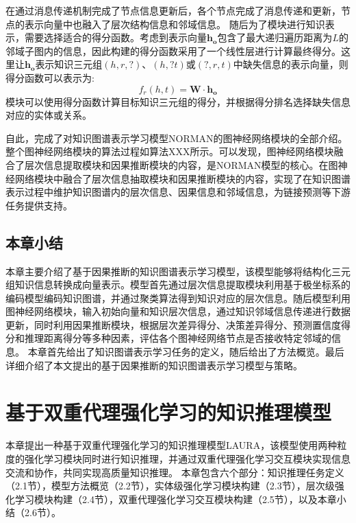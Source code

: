 \documentclass[algorithmlist, AutoFakeBold, AutoFakeSlant, figurelist, tablelist, nomlist, masters]{seuthesix}
\begin{document}
在通过消息传递机制完成了节点信息更新后，各个节点完成了消息传递和更新，节点的表示向量中也融入了层次结构信息和邻域信息。
随后为了模块进行知识表示，需要选择适合的得分函数。考虑到表示向量$\bm{h_o}$包含了最大递归遍历距离为$L$的邻域子图内的信息，因此构建的得分函数采用了一个线性层进行计算最终得分。这里让$\bm{h_o}$表示知识三元组$(h, r, ?)$、$(h, ? t)$或$(?, r, t)$中缺失信息的表示向量，则得分函数可以表示为:
\begin{equation}
  f_{r}(h, t) = \mathbf{W} \cdot \bm{h_o}
  \label{equation_GNNScore}
\end{equation}
模块可以使用得分函数计算目标知识三元组的得分，并根据得分排名选择缺失信息对应的实体或关系。


自此，完成了对知识图谱表示学习模型NORMAN的图神经网络模块的全部介绍。整个图神经网络模块的算法过程如算法XXX所示。可以发现，图神经网络模块融合了层次信息提取模块和因果推断模块的内容，是NORMAN模型的核心。在图神经网络模块中融合了层次信息抽取模块和因果推断模块的内容，实现了在知识图谱表示过程中维护知识图谱内的层次信息、因果信息和邻域信息，为链接预测等下游任务提供支持。


\section{本章小结}
本章主要介绍了基于因果推断的知识图谱表示学习模型，该模型能够将结构化三元组知识信息转换成向量表示。模型首先通过层次信息提取模块利用基于极坐标系的编码模型编码知识图谱，并通过聚类算法得到知识对应的层次信息。随后模型利用图神经网络模块，输入初始向量和知识层次信息，通过知识邻域信息传递进行数据更新，同时利用因果推断模块，根据层次差异得分、决策差异得分、预测置信度得分和推理距离得分等多种因素，评估各个图神经网络节点是否接收特定邻域的信息。
本章首先给出了知识图谱表示学习任务的定义，随后给出了方法概览。最后详细介绍了本文提出的基于因果推断的知识图谱表示学习模型与策略。


\chapter{基于双重代理强化学习的知识推理模型}
本章提出一种基于双重代理强化学习的知识推理模型LAURA，该模型使用两种粒度的强化学习模块同时进行知识推理，并通过双重代理强化学习交互模块实现信息交流和协作，共同实现高质量知识推理。
本章包含六个部分：知识推理任务定义（2.1节），模型方法概览（2.2节），实体级强化学习模块构建（2.3节），层次级强化学习模块构建（2.4节），双重代理强化学习交互模块构建（2.5节），以及本章小结（2.6节）。
\end{document}
